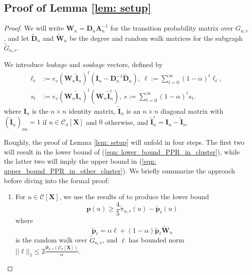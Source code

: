 \documentclass{article}
\let\pprspace\relax
\newcommand{\1}{\mathbf{1}}
\newcommand{\pbf}{\mathbf{p}}
\newcommand{\Abf}{\mathbf{A}}
\newcommand{\Xbf}{\mathbf{X}}
\newcommand{\Wbf}{\mathbf{W}}
\newcommand{\Dbf}{\mathbf{D}}
\newcommand{\Cset}{\mathcal{C}}
\newcommand{\Csig}{\Cset_{\sigma}}
\newcommand{\pprspace}{{\sc PPR~}}
\newcommand{\wDbf}{\widetilde{\Dbf}}
\theoremstyle{aldenthm}
\begin{document}
\subsection{Proof of Lemma \ref{lem: setup}}

\begin{proof}
	We will write $\Wbf_n = \Dbf_n \Abf_n^{-1}$ for the transition probability matrix over $G_{n,r}$, and let $\widetilde{\Dbf}_n$ and $\widetilde{\Wbf}_n$ be the degree and random walk matrices for the subgraph $\widetilde{G}_{n,r}$.
	
	We introduce \emph{leakage} and \emph{soakage} vectors, defined by
	\begin{align*}
	\ell_t & := e_v (\Wbf_n \widetilde{\mathbf{I}}_n )^t (\mathbf{I}_n - \Dbf_n^{-1} \wDbf_{n}),~ \ell := \sum_{t = 0}^{\infty} (1 - \alpha)^t \ell_t, \\
	s_t & := e_v (\Wbf_n \widetilde{\mathbf{I}}_n )^t (\Wbf_n \widetilde{\mathbf{I}}_n^c),~ s := \sum_{t = 0}^{\infty} (1 - \alpha)^{t} s_t.
	\end{align*}
	where $\mathbf{I}_n$ is the $n \times n$ identity matrix, $\widetilde{\mathbf{I}}_n$ is an $n \times n$ diagonal matrix with $(\widetilde{\mathbf{I}}_n)_{uu} = 1$ if $u \in \Csig[\Xbf]$ and $0$ otherwise, and $\widetilde{\mathbf{I}}_n^c = \mathbf{I}_n - \widetilde{\mathbf{I}}_n$. 
	
	Roughly, the proof of Lemma \ref{lem: setup} will unfold in four steps. The first two will result in the lower bound of (\ref{eqn: lower_bound_PPR_in_cluster}), while the latter two will imply the upper bound in (\ref{eqn: upper_bound_PPR_in_other_cluster}). We briefly summarize the approach before diving into the formal proof:
	
	\begin{enumerate}
		\item For $u \in \Cset[\Xbf]$, we use the results of \cite{zhu2013} to produce the lower bound 
		\begin{equation*}
		\pbf(u) \geq \frac{4}{5}\widetilde{\pi}_{n,r}(u) - \widetilde{\pbf}_{\ell}(u)
		\end{equation*}
		where 
		\begin{equation*}
		\widetilde{\pbf}_{\ell} = \alpha \ell + (1 - \alpha) \widetilde{\pbf}_{\ell} \widetilde{\Wbf}_n
		\end{equation*}
		is the \pprspace random walk over $\widetilde{G}_{n,r}$, and $\ell$ has bounded norm $||\ell||_1 \leq 2\frac{\Phi_{n,r}(\Csig[\Xbf])}{\alpha}$.
		

\end{enumerate}
\end{proof}
\end{document}
